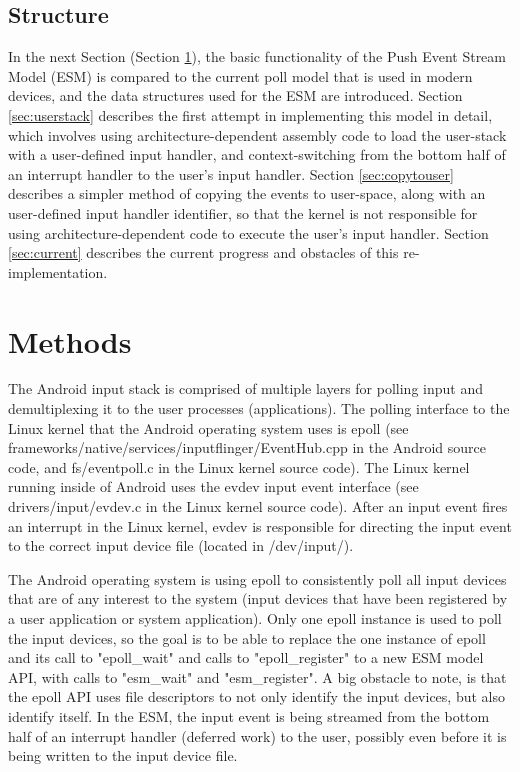 \documentclass[10pt,journal,compsoc]{IEEEtran}
\begin{document}
\subsection{Structure}
\label{sec:structure}
In the next Section (Section \ref{sec:methods}), the basic functionality of the Push Event Stream Model (ESM) is compared to the current poll model that is used in modern devices, and the data structures used for the ESM are introduced. Section \ref{sec:userstack} describes the first attempt in implementing this model in detail, which involves using architecture-dependent assembly code to load the user-stack with a user-defined input handler, and context-switching from the bottom half of an interrupt handler to the user's input handler. Section \ref{sec:copytouser} describes a simpler method of copying the events to user-space, along with an user-defined input handler identifier, so that the kernel is not responsible for using architecture-dependent code to execute the user's input handler. Section \ref{sec:current} describes the current progress and obstacles of this re-implementation.

\section{Methods}
\label{sec:methods}
The Android input stack is comprised of multiple layers for polling input and demultiplexing it to the user processes (applications). The polling interface to the Linux kernel that the Android operating system uses is epoll (see frameworks/native/services/inputflinger/EventHub.cpp in the Android source code, and fs/eventpoll.c in the Linux kernel source code). The Linux kernel running inside of Android uses the evdev input event interface (see drivers/input/evdev.c in the Linux kernel source code). After an input event fires an interrupt in the Linux kernel, evdev is responsible for directing the input event to the correct input device file (located in /dev/input/).

The Android operating system is using epoll to consistently poll all input devices that are of any interest to the system (input devices that have been registered by a user application or system application). Only one epoll instance is used to poll the input devices, so the goal is to be able to replace the one instance of epoll and its call to "epoll\_wait" and calls to "epoll\_register" to a new ESM model API, with calls to "esm\_wait" and "esm\_register". A big obstacle to note, is that the epoll API uses file descriptors to not only identify the input devices, but also identify itself. In the ESM, the input event is being streamed from the bottom half of an interrupt handler (deferred work) to the user, possibly even before it is being written to the input device file.
\end{document}
